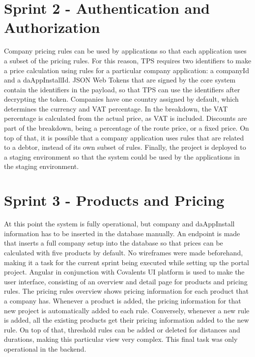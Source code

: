 %
\section{Sprint 2 - Authentication and Authorization}
Company pricing rules can be used by applications so that each application uses a subset of the pricing rules. For this reason, TPS requires two identifiers to make a price calculation using rules for a particular company application: a companyId and a daAppInstallId. JSON Web Tokens that are signed by the core system contain the identifiers in the payload, so that TPS can use the identifiers after decrypting the token. Companies have one country assigned by default, which determines the currency and VAT percentage. In the breakdown, the VAT percentage is calculated from the actual price, as VAT is included. Discounts are part of the breakdown, being a percentage of the route price, or a fixed price. On top of that, it is possible that a company application uses rules that are related to a debtor, instead of its own subset of rules. Finally, the project is deployed to a staging environment so that the system could be used by the applications in the staging environment.

%
\section{Sprint 3 - Products and Pricing}
At this point the system is fully operational, but company and daAppInstall information has to be inserted in the database manually. An endpoint is made that inserts a full company setup into the database so that prices can be calculated with five products by default. No wireframes were made beforehand, making it a task for the current sprint being executed while setting up the portal project. Angular in conjunction with Covalents UI platform is used to make the user interface, consisting of an overview and detail page for products and pricing rules. The pricing rules overview shows pricing information for each product that a company has. Whenever a product is added, the pricing information for that new project is automatically added to each rule. Conversely, whenever a new rule is added, all the existing products get their pricing information added to the new rule. On top of that, threshold rules can be added or deleted for distances and durations, making this particular view very complex. This final task was only operational in the backend.


